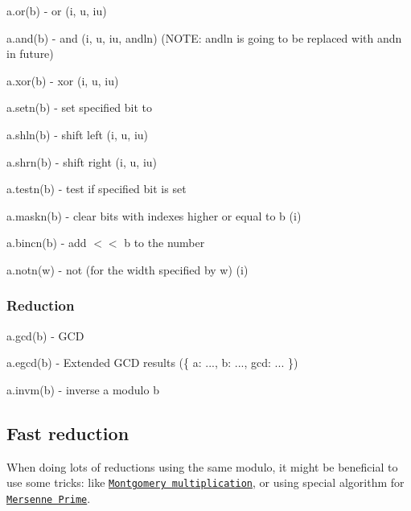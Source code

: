 \begin{DoxyItemize}
\item {\ttfamily a.\+or(b)} -\/ or ({\ttfamily i}, {\ttfamily u}, {\ttfamily iu})
\item {\ttfamily a.\+and(b)} -\/ and ({\ttfamily i}, {\ttfamily u}, {\ttfamily iu}, {\ttfamily andln}) (N\+O\+TE\+: {\ttfamily andln} is going to be replaced with {\ttfamily andn} in future)
\item {\ttfamily a.\+xor(b)} -\/ xor ({\ttfamily i}, {\ttfamily u}, {\ttfamily iu})
\item {\ttfamily a.\+setn(b)} -\/ set specified bit to {}
\item {\ttfamily a.\+shln(b)} -\/ shift left ({\ttfamily i}, {\ttfamily u}, {\ttfamily iu})
\item {\ttfamily a.\+shrn(b)} -\/ shift right ({\ttfamily i}, {\ttfamily u}, {\ttfamily iu})
\item {\ttfamily a.\+testn(b)} -\/ test if specified bit is set
\item {\ttfamily a.\+maskn(b)} -\/ clear bits with indexes higher or equal to {\ttfamily b} ({\ttfamily i})
\item {\ttfamily a.\+bincn(b)} -\/ add { $<$$<$ b} to the number
\item {\ttfamily a.\+notn(w)} -\/ not (for the width specified by {\ttfamily w}) ({\ttfamily i})
\end{DoxyItemize}

\subsubsection*{Reduction}


\begin{DoxyItemize}
\item {\ttfamily a.\+gcd(b)} -\/ G\+CD
\item {\ttfamily a.\+egcd(b)} -\/ Extended G\+CD results ({\ttfamily \{ a\+: ..., b\+: ..., gcd\+: ... \}})
\item {\ttfamily a.\+invm(b)} -\/ inverse {\ttfamily a} modulo {\ttfamily b}
\end{DoxyItemize}

\subsection*{Fast reduction}

When doing lots of reductions using the same modulo, it might be beneficial to use some tricks\+: like \href{https://en.wikipedia.org/wiki/Montgomery_modular_multiplication}{\tt Montgomery multiplication}, or using special algorithm for \href{https://en.wikipedia.org/wiki/Mersenne_prime}{\tt Mersenne Prime}.


